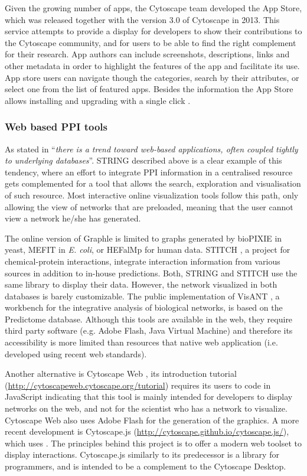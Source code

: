 Given the growing number of  apps,  the Cytoscape team developed the App Store, which was released together with the version 3.0 of Cytoscape in 2013. This service attempts to provide a display for developers to show their contributions to the Cytoscape community, and for users to be able to find the right complement for their research. App authors can include screenshots, descriptions, links and other metadata in order to highlight the features of the app and facilitate its use. App store users can navigate though the categories, search by their attributes, or select one from the list of featured apps. Besides the information the App Store allows installing and upgrading with a single click \cite{LOT2013}. 

\subsubsection{Web based PPI tools}
As stated in \cite{GEH2010} ``\emph{there is a trend toward web-based applications, often coupled tightly to underlying databases}''. STRING described  above is a clear example of this tendency, where an effort to integrate PPI information in a centralised resource gets complemented for a tool that allows the search, exploration and visualisation of such resource. Most interactive online visualization tools follow this path, only allowing the view of networks that are preloaded, meaning that the user cannot view a network he/she has generated.

The online version of Graphle \cite{HUT2009} is limited to graphs generated by bioPIXIE in yeast, MEFIT in \emph{E. coli}, or HEFalMp for human data. STITCH \cite{KUH2008}, a project for chemical-protein interactions, integrate interaction information from various sources in addition to in-house predictions. Both, STRING and STITCH use the same library to display their data. However, the network visualized in both databases is barely customizable. The public implementation of VisANT \cite{HU2013}, a workbench for the integrative analysis of biological networks, is based on the Predictome database.  Although this tools are available in the web, they require third party software (e.g. Adobe Flash, Java Virtual Machine) and therefore its accessibility is more limited than resources that native web application (i.e. developed using recent web standards).  

Another alternative is Cytoscape Web \cite{LOP2010}, its introduction tutorial (\url{http://cytoscapeweb.cytoscape.org/tutorial}) requires its users to code in JavaScript indicating that this tool is mainly intended for developers to display networks on the web, and not for the scientist who has a network to visualize. Cytoscape Web also uses Adobe Flash for the generation of the graphics. A more recent development is Cytoscape.js (\url{http://cytoscape.github.io/cytoscape.js/}), which uses . The principles behind this project is to offer a modern web toolset to display interactions. Cytoscape.js similarly to its predecessor is a library for programmers, and is intended to be a complement to the Cytoscape Desktop.

